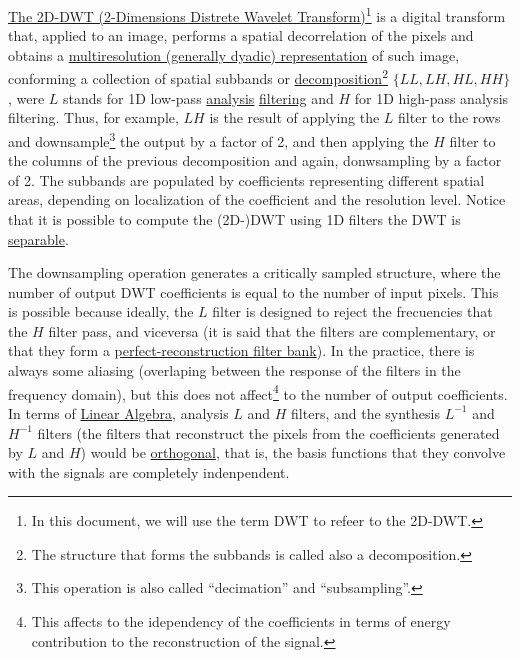 \href{https://vicente-gonzalez-ruiz.github.io/image_transformations_for_coding/#x1-3100020}{The
  2D-DWT (2-Dimensions Distrete Wavelet Transform)\footnote{In this
    document, we will use the term DWT to refeer to the 2D-DWT.}} is a
digital transform that, applied to an image, performs a spatial
decorrelation of the pixels and obtains a
\href{https://vicente-gonzalez-ruiz.github.io/image_transformations_for_coding/index.html#x1-3500024}{multiresolution
  (generally dyadic) representation} of such image, conforming a
collection of spatial subbands or
\href{https://en.wikipedia.org/wiki/Sub-band_coding}{decomposition}\footnote{The
  structure that forms the subbands is called also a decomposition.}
$\{LL, LH, HL, HH\}$, were $L$ stands for 1D low-pass
\href{https://en.wikipedia.org/wiki/Filter_bank}{analysis}
\href{https://en.wikipedia.org/wiki/Filter_(signal_processing)}{filtering}
and $H$ for 1D high-pass analysis filtering. Thus, for example, $LH$
is the result of applying the $L$ filter to the rows and
downsample\footnote{This operation is also called ``decimation'' and
  ``subsampling''.} the output by a factor of 2, and then applying the
$H$ filter to the columns of the previous decomposition and again,
donwsampling by a factor of 2. The subbands are populated by
coefficients representing different spatial areas, depending on
localization of the coefficient and the resolution level. Notice that
it is possible to compute the (2D-)DWT using 1D filters the DWT is
\href{http://home.ustc.edu.cn/~xuedixiu/image.ustc/course/dip/DIP14-ch3.pdf}{separable}.

The downsampling operation generates a critically sampled structure,
where the number of output DWT coefficients is equal to the number of
input pixels. This is possible because ideally, the $L$ filter is
designed to reject the frecuencies that the $H$ filter pass, and
viceversa (it is said that the filters are complementary, or that they
form a
\href{https://en.wikipedia.org/wiki/Filter_bank#Perfect_reconstruction_filter_banks}{perfect-reconstruction
  filter bank}). In the practice, there is always some aliasing
(overlaping between the response of the filters in the frequency
domain), but this does not affect\footnote{This affects to the
  idependency of the coefficients in terms of energy contribution to
  the reconstruction of the signal.} to the number of output
coefficients. In terms of
\href{https://en.wikipedia.org/wiki/Linear_algebra}{Linear Algebra},
analysis $L$ and $H$ filters, and the synthesis $L^{-1}$ and $H^{-1}$
filters (the filters that reconstruct the pixels from the coefficients
generated by $L$ and $H$) would be
\href{https://en.wikipedia.org/wiki/Orthogonality}{orthogonal}, that
is, the basis functions that they convolve with the signals are
completely indenpendent.

